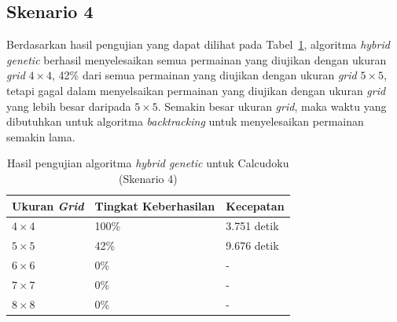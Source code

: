 \subsection{Skenario 4}
\label{sec:skenario4}

Berdasarkan hasil pengujian yang dapat dilihat pada Tabel~\ref{tab:pengujianhg4}, algoritma \textit{hybrid genetic} berhasil menyelesaikan semua permainan yang diujikan dengan ukuran \textit{grid} \begin{math}4 \times 4\end{math}, 42\% dari semua permainan yang diujikan dengan ukuran \textit{grid} \begin{math}5 \times 5\end{math}, tetapi gagal dalam menyelsaikan permainan yang diujikan dengan ukuran \textit{grid} yang lebih besar daripada \begin{math}5 \times 5\end{math}. Semakin besar ukuran \textit{grid}, maka waktu yang dibutuhkan untuk algoritma \textit{backtracking} untuk menyelesaikan permainan semakin lama.

\begin{table}
\centering
\captionsetup{justification=centering}
\caption[Hasil pengujian algoritma \textit{hybrid genetic} untuk Calcudoku (Skenario 4)]{Hasil pengujian algoritma \textit{hybrid genetic} untuk Calcudoku (Skenario 4)}
\begin{tabular}{| l | l | l |}
\hline
Ukuran \textit{Grid} & Tingkat Keberhasilan & Kecepatan \\
\hline \hline
\begin{math}4 \times 4\end{math} & 100\% & 3.751 detik \\
\hline
\begin{math}5 \times 5\end{math} & 42\% & 9.676 detik \\
\hline
\begin{math}6 \times 6\end{math} & 0\% & - \\
\hline
\begin{math}7 \times 7\end{math} & 0\% & - \\
\hline
\begin{math}8 \times 8\end{math} & 0\% & - \\
\hline
\end{tabular}
\label{tab:pengujianhg4}
\end{table}

